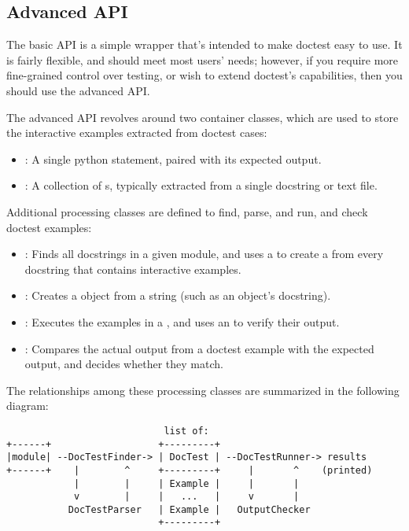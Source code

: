 \subsection{Advanced API\label{doctest-advanced-api}}

The basic API is a simple wrapper that's intended to make doctest easy
to use.  It is fairly flexible, and should meet most users' needs;
however, if you require more fine-grained control over testing, or
wish to extend doctest's capabilities, then you should use the
advanced API.

The advanced API revolves around two container classes, which are used
to store the interactive examples extracted from doctest cases:

\begin{itemize}
\item {}: A single python statement, paired with its
      expected output.
\item {}: A collection of s, typically
      extracted from a single docstring or text file.
\end{itemize}

Additional processing classes are defined to find, parse, and run, and
check doctest examples:

\begin{itemize}
\item {}: Finds all docstrings in a given module,
      and uses a  to create a 
      from every docstring that contains interactive examples.
\item {}: Creates a  object from
      a string (such as an object's docstring).
\item {}: Executes the examples in a
      , and uses an  to verify
      their output.
\item {}: Compares the actual output from a
      doctest example with the expected output, and decides whether
      they match.
\end{itemize}

The relationships among these processing classes are summarized in the
following diagram:

\begin{verbatim}
                            list of:
+------+                   +---------+
|module| --DocTestFinder-> | DocTest | --DocTestRunner-> results
+------+    |        ^     +---------+     |       ^    (printed)
            |        |     | Example |     |       |
            v        |     |   ...   |     v       |
           DocTestParser   | Example |   OutputChecker
                           +---------+
\end{verbatim}

